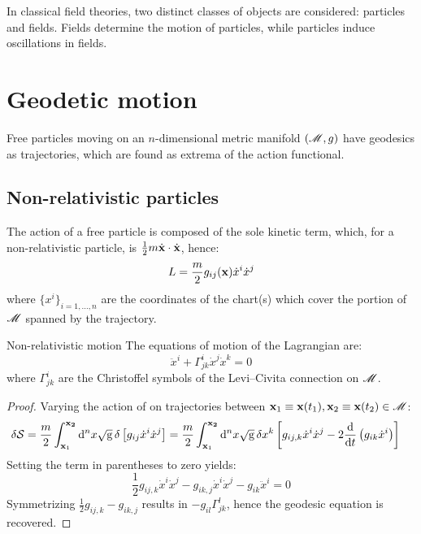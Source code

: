 
In classical field theories, two distinct classes of objects are considered: particles and fields. Fields determine the motion of particles, while particles induce oscillations in fields.

\section{Geodetic motion}

Free particles moving on an $ n $-dimensional metric manifold $ (\mathscr{M},g) $ have geodesics as trajectories, which are found as extrema of the action functional.

\subsection{Non-relativistic particles}

The action of a free particle is composed of the sole kinetic term, which, for a non-relativistic particle, is $ \frac{1}{2} m \dot{\mathbf{x}} \cdot \dot{\mathbf{x}} $, hence:
\begin{equation}
  L = \frac{m}{2} g_{ij}(\mathbf{x}) \dot{x}^i \dot{x}^j
  \label{eq:non-rel-lag}
\end{equation}
where $ \{x^i\}_{i = 1 , \dots , n} $ are the coordinates of the chart(s) which cover the portion of $ \mathscr{M} $ spanned by the trajectory.

\begin{proposition}{Non-relativistic motion}{}
  The equations of motion of the Lagrangian  are:
  \begin{equation}
    \ddot{x}^i + \Gamma^i_{jk} \dot{x}^j \dot{x}^k = 0
  \end{equation}
  where $ \Gamma^i_{jk} $ are the Christoffel symbols of the Levi--Civita connection on $ \mathscr{M} $.
\end{proposition}

\begin{proofbox}
  \begin{proof}
    Varying the action of  on trajectories between $ \mathbf{x}_1 \equiv \mathbf{x}(t_1) , \mathbf{x}_2 \equiv \mathbf{x}(t_2) \in \mathscr{M} $:
    \begin{equation*}
      \begin{split}
        \delta \mathcal{S}
        & = \frac{m}{2} \int_{\mathbf{x}_1}^{\mathbf{x_2}} \mathrm{d}^n x \sqrt{\mathrm{g}} \, \delta \left[ g_{ij} \dot{x}^i \dot{x}^j \right]
        = \frac{m}{2} \int_{\mathbf{x}_1}^{\mathbf{x_2}} \mathrm{d}^n x \sqrt{\mathrm{g}} \, \delta x^k \left[ g_{ij,k} \dot{x}^i \dot{x}^j - 2 \frac{\mathrm{d}}{\mathrm{d} t} \left( g_{ik} \dot{x}^i \right) \right]
      \end{split}
    \end{equation*}
    Setting the term in parentheses to zero yields:
    \begin{equation*}
      \frac{1}{2} g_{ij,k} \dot{x}^i \dot{x}^j - g_{ik,j} \dot{x}^i \dot{x}^j - g_{ik} \ddot{x}^i = 0
    \end{equation*}
    Symmetrizing $ \frac{1}{2} g_{ij,k} - g_{ik,j} $ results in $ - g_{i l} \Gamma^l_{jk} $, hence the geodesic equation is recovered.
  \end{proof}
\end{proofbox}

